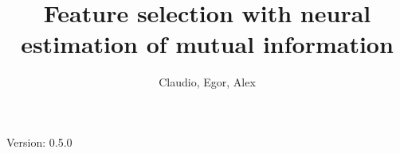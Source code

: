 \documentclass{mypaper}
\author{
Claudio,
Egor,
Alex
}
\title{Feature selection with neural estimation of mutual information}
\begin{document}
\maketitle

Version: 0.5.0







\end{document}
